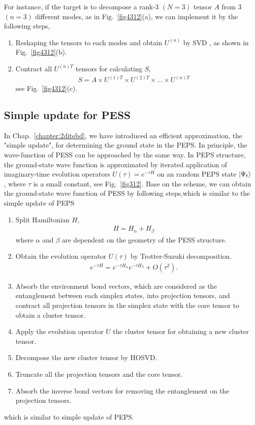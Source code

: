 For instance, if the target is to decompose a rank-3 $(N=3)$ tensor $A$ from 3 $(n=3)$ different modes, as in Fig.~\ref{fig4312}(a), we can implement it by the following steps, 
\begin{enumerate}
	\item	Reshaping the tensors to each modes and obtain $U^{(n)}$ by SVD , as shown in Fig.~\ref{fig4312}(b).
	\item	Contract all $U^{(n)T}$ tensors for calculating $S$, 
		\begin{align}
			S = A \times U^{(1)T} \times U^{(2)T} \times \dots \times U^{(n)T}
		\end{align} 
		see Fig.~\ref{fig4312}(c).
\end{enumerate}
\subsection{Simple update for PESS}
In Chap.~\ref{chapter:2ditebd}, we have introduced an efficient approximation, the "simple update", for determining the ground state in the PEPS. In principle, the wave-function of PESS can be approached by the same way. In PEPS structure, the ground-state wave function is approximated by iterated application of imaginary-time evolution operators $U(\tau) = e^{-\tau H}$ on an random PEPS state $\Ket{\Psi_t}$, where $\tau$ is a small constant, see Fig.~\ref{fig312}. Base on the scheme, we can obtain the ground-state wave function of PESS by following steps,which is similar to the simple update of PEPS
\begin{enumerate}
	\item Split Hamiltonian $H$,  
		\begin{align}
			\label{splitH}
			H = H_{\alpha} + H_{\beta}
		\end{align}
		where $\alpha$ and $\beta$ are dependent on the geometry of the PESS structure.
	\item Obtain the evolution operator $U(\tau)$ by Trotter-Suzuki decomposition.
		\begin{align}
			e^{-\tau H} = e^{-\tau H_{\alpha}} e^{-\tau H_{\beta}} + O(\tau^{2}).
		\end{align}
	\item Absorb the environment bond vectors, which are considered as the entanglement between each simplex states, into projection tensors, and contract all projection tensors in the simplex state with the core tensor to obtain a cluster tensor.
	\item Apply the evolution operator $U$ the cluster tensor for obtaining a new cluster tensor.
	\item Decompose the new cluster tensor by HOSVD.
	\item Truncate all the projection tensors and the core tensor.
	\item Absorb the inverse bond vectors for removing the entanglement on the projection tensors.
\end{enumerate}
which is similar to simple update of PEPS.


